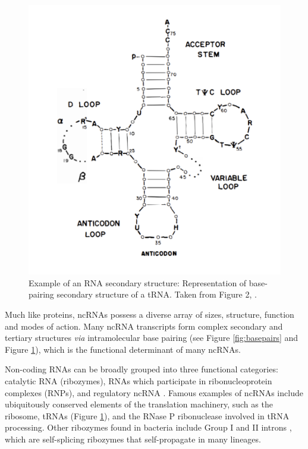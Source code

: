 \begin{figure}[H]
\begin{minipage}[b]{0.47\linewidth}
          \includegraphics[scale=0.15]{intro/tRNA.png}
  \centering
  \caption[Example of an RNA secondary structure]{Example of an RNA secondary structure: Representation of base-pairing secondary structure of a tRNA. Taken from Figure 2, \cite{Rich1976-hs}.}
  \label{fig:tRNA}
    \end{minipage}
\end{figure}

Much like proteins, ncRNAs possess a diverse array of sizes, structure, function and modes of action. Many ncRNA transcripts form complex secondary and tertiary structures \textit{via} intramolecular base pairing (see Figure \ref{fig:basepairs} and Figure \ref{fig:tRNA}), which is the functional determinant of many ncRNAs. \par

Non-coding RNAs can be broadly grouped into three functional categories: catalytic RNA (ribozymes), RNAs which participate in ribonucleoprotein complexes (RNPs), and regulatory ncRNA \citep{Cech2014-pe}. Famous examples of ncRNAs include ubiquitously conserved elements of the translation machinery, such as the ribosome, tRNAs (Figure \ref{fig:tRNA}), and the RNase P ribonuclease involved in tRNA processing. Other ribozymes found in bacteria include Group I and II introns \citep{Lambowitz2011-oq,Hausner2014-ud}, which are self-splicing ribozymes that self-propagate in many lineages.

